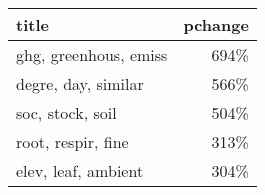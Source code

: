\begin{tabular}{p{1.2cm}r}
\toprule
                 title &  pchange \\
\midrule
 ghg, greenhous, emiss &     694\% \\
   degre, day, similar &     566\% \\
      soc, stock, soil &     504\% \\
    root, respir, fine &     313\% \\
   elev, leaf, ambient &     304\% \\
\bottomrule
\end{tabular}
